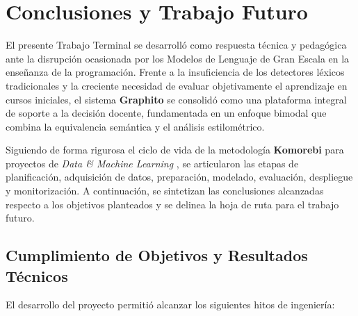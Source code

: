 \chapter{Conclusiones y Trabajo Futuro}
\label{cap:conclusiones}

El presente Trabajo Terminal se desarrolló como respuesta técnica y pedagógica ante la disrupción ocasionada por los Modelos de Lenguaje de Gran Escala en la enseñanza de la programación. Frente a la insuficiencia de los detectores léxicos tradicionales y la creciente necesidad de evaluar objetivamente el aprendizaje en cursos iniciales, el sistema \textbf{Graphito} se consolidó como una plataforma integral de soporte a la decisión docente, fundamentada en un enfoque bimodal que combina la equivalencia semántica y el análisis estilométrico.

Siguiendo de forma rigurosa el ciclo de vida de la metodología \textbf{Komorebi} para proyectos de \textit{Data \& Machine Learning} \cite{verges_como_2023}, se articularon las etapas de planificación, adquisición de datos, preparación, modelado, evaluación, despliegue y monitorización. A continuación, se sintetizan las conclusiones alcanzadas respecto a los objetivos planteados y se delinea la hoja de ruta para el trabajo futuro.

\section{Cumplimiento de Objetivos y Resultados Técnicos}
\label{sec:cumplimiento_objetivos}

El desarrollo del proyecto permitió alcanzar los siguientes hitos de ingeniería:

